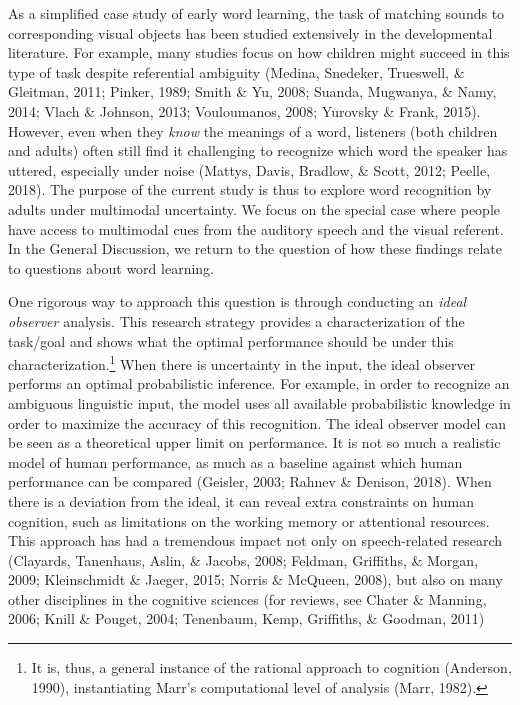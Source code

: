 \documentclass[english,,man,floatsintext]{apa6}
\let\rmarkdownfootnote\footnote%
\def\footnote{\protect\rmarkdownfootnote}
\theoremstyle{definition}
\theoremstyle{definition}
\theoremstyle{definition}
\theoremstyle{remark}
\begin{document}
As a simplified case study of early word learning, the task of matching
sounds to corresponding visual objects has been studied extensively in
the developmental literature. For example, many studies focus on how
children might succeed in this type of task despite referential
ambiguity (Medina, Snedeker, Trueswell, \& Gleitman, 2011; Pinker, 1989;
Smith \& Yu, 2008; Suanda, Mugwanya, \& Namy, 2014; Vlach \& Johnson,
2013; Vouloumanos, 2008; Yurovsky \& Frank, 2015). However, even when
they \emph{know} the meanings of a word, listeners (both children and
adults) often still find it challenging to recognize which word the
speaker has uttered, especially under noise (Mattys, Davis, Bradlow, \&
Scott, 2012; Peelle, 2018). The purpose of the current study is thus to
explore word recognition by adults under multimodal uncertainty. We
focus on the special case where people have access to multimodal cues
from the auditory speech and the visual referent. In the General
Discussion, we return to the question of how these findings relate to
questions about word learning.

One rigorous way to approach this question is through conducting an
\emph{ideal observer} analysis. This research strategy provides a
characterization of the task/goal and shows what the optimal performance
should be under this characterization.\footnote{It is, thus, a general
  instance of the rational approach to cognition (Anderson, 1990),
  instantiating Marr's computational level of analysis (Marr, 1982).}
When there is uncertainty in the input, the ideal observer performs an
optimal probabilistic inference. For example, in order to recognize an
ambiguous linguistic input, the model uses all available probabilistic
knowledge in order to maximize the accuracy of this recognition. The
ideal observer model can be seen as a theoretical upper limit on
performance. It is not so much a realistic model of human performance,
as much as a baseline against which human performance can be compared
(Geisler, 2003; Rahnev \& Denison, 2018). When there is a deviation from
the ideal, it can reveal extra constraints on human cognition, such as
limitations on the working memory or attentional resources. This
approach has had a tremendous impact not only on speech-related research
(Clayards, Tanenhaus, Aslin, \& Jacobs, 2008; Feldman, Griffiths, \&
Morgan, 2009; Kleinschmidt \& Jaeger, 2015; Norris \& McQueen, 2008),
but also on many other disciplines in the cognitive sciences (for
reviews, see Chater \& Manning, 2006; Knill \& Pouget, 2004; Tenenbaum,
Kemp, Griffiths, \& Goodman, 2011)
\end{document}
